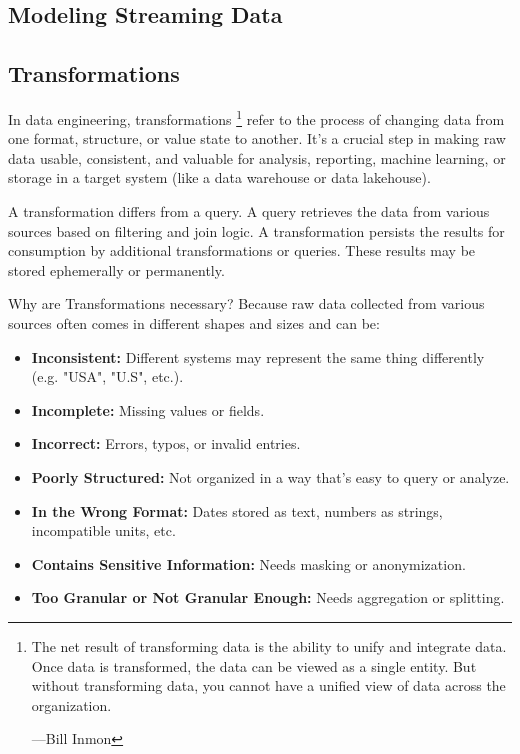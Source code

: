 \subsection*{Modeling Streaming Data}












\subsection{Transformations}
In data engineering, transformations
\footnote{
    The net result of transforming data is the ability to unify
    and integrate data. Once data is transformed, the data can
    be viewed as a single entity. But without transforming data,
    you cannot have a unified view of data across the
    organization.

    —Bill Inmon
}
refer to the process of changing data from one format, structure,
or value state to another. It's a crucial step in making raw data
usable, consistent, and valuable for analysis, reporting,
machine learning, or storage in a target system 
(like a data warehouse or data lakehouse).

A transformation differs from a query. A query retrieves the data
from various sources based on filtering and join logic.
A transformation persists the results for consumption by
additional transformations or queries. These results may be stored
ephemerally or permanently.

Why are Transformations necessary? Because raw data collected from
various sources often comes in different shapes and sizes and can be:
\begin{itemize}
    \item \textbf{Inconsistent:} Different systems may represent the
    same thing differently (e.g. "USA", "U.S", etc.).

    \item \textbf{Incomplete:} Missing values or fields.

    \item \textbf{Incorrect:} Errors, typos, or invalid entries.
    
    \item \textbf{Poorly Structured:} Not organized in a way that's easy
    to query or analyze.

    \item \textbf{In the Wrong Format:} Dates stored as text, numbers
    as strings, incompatible units, etc.

    \item \textbf{Contains Sensitive Information:} Needs masking or
    anonymization.

    \item \textbf{Too Granular or Not Granular Enough:} Needs aggregation
    or splitting.
\end{itemize}

